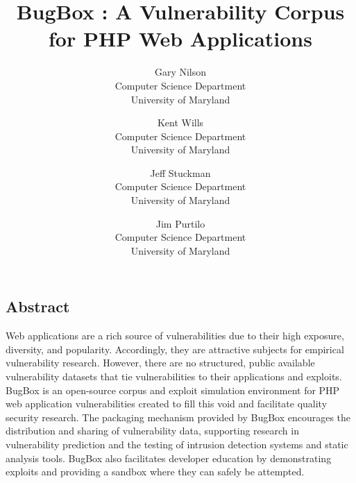 \documentclass[letterpaper,twocolumn,10pt]{article}
\begin{document}
\date{}


\title{\Large \bf BugBox : A Vulnerability Corpus for PHP Web Applications}


\author{
{\rm Gary Nilson}\\
Computer Science Department\\
University of Maryland
\and
{\rm Kent Wills}\\
Computer Science Department\\
University of Maryland
\and
{\rm Jeff Stuckman}\\
Computer Science Department\\
University of Maryland
\and
{\rm Jim Purtilo}\\
Computer Science Department\\
University of Maryland
} %

\maketitle



 
 

\subsection*{Abstract}

Web applications are a rich source of vulnerabilities due to their high exposure, diversity, and popularity. Accordingly, they are attractive subjects for empirical vulnerability research. However, there are no structured, public available vulnerability datasets that tie vulnerabilities to their applications and exploits. BugBox is an open-source corpus and exploit simulation environment for PHP web application vulnerabilities created to fill this void and facilitate quality security research. The packaging mechanism provided by BugBox encourages the distribution and sharing of vulnerability data, supporting research in vulnerability prediction and the testing of intrusion detection systems and static analysis tools. BugBox also facilitates developer education by demonstrating exploits and providing a sandbox where they can safely be attempted.
\end{document}

